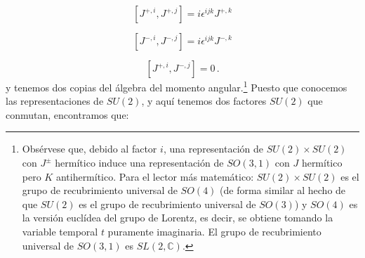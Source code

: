 \documentclass[a4paper,11pt]{book} %
\begin{document}
\begin{equation}
\left[ J^{+,i}, J^{+,j} \right] = i\epsilon^{ijk} J^{+,k}
\end{equation}
 
\begin{equation}
\left[ J^{-,i}, J^{-,j} \right] = i\epsilon^{ijk} J^{-,k}
\end{equation}
 
\begin{equation}
\left[ J^{+,i}, J^{-,j} \right] = 0 \, .
\end{equation}
 \noindent
y  tenemos dos copias del álgebra del momento angular.\footnote{Obsérvese que,
debido al factor $i$, una representación de
$SU(2) \times SU(2)$ con $J^{\pm}$ hermítico induce una representación de
$SO(3,1)$ con $J$ hermítico pero $K$ antihermítico. Para el lector más
matemático: $SU(2) \times SU(2)$ es el grupo de recubrimiento universal de
$SO(4)$ (de forma similar al hecho de que $SU(2)$ es el grupo de recubrimiento
universal de $SO(3)$) y $SO(4)$ es la versión euclídea del grupo de Lorentz, es
decir, se obtiene tomando la variable temporal $t$ puramente imaginaria. El grupo
de recubrimiento universal de $SO(3,1)$ es $SL(2,\mathbb{C})$.}
 \medskip\newline
Puesto que conocemos las representaciones de $SU(2)$, y aquí tenemos dos factores
$SU(2)$ que conmutan, encontramos que:
 
\end{document}
